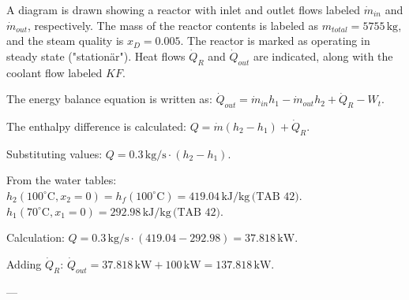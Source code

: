 A diagram is drawn showing a reactor with inlet and outlet flows labeled \( \dot{m}_{in} \) and \( \dot{m}_{out} \), respectively. The mass of the reactor contents is labeled as \( m_{total} = 5755 \, \text{kg} \), and the steam quality is \( x_D = 0.005 \). The reactor is marked as operating in steady state ("stationär"). Heat flows \( \dot{Q}_R \) and \( \dot{Q}_{out} \) are indicated, along with the coolant flow labeled \( KF \).  

The energy balance equation is written as:  
\( \dot{Q}_{out} = \dot{m}_{in} h_1 - \dot{m}_{out} h_2 + \dot{Q}_R - W_{t} \).  

The enthalpy difference is calculated:  
\( Q = \dot{m} (h_2 - h_1) + \dot{Q}_R \).  

Substituting values:  
\( Q = 0.3 \, \text{kg/s} \cdot (h_2 - h_1) \).  

From the water tables:  
\( h_2 (100^\circ \text{C}, x_2 = 0) = h_f (100^\circ \text{C}) = 419.04 \, \text{kJ/kg} \, \text{(TAB 42)} \).  
\( h_1 (70^\circ \text{C}, x_1 = 0) = 292.98 \, \text{kJ/kg} \, \text{(TAB 42)} \).  

Calculation:  
\( Q = 0.3 \, \text{kg/s} \cdot (419.04 - 292.98) = 37.818 \, \text{kW} \).  

Adding \( \dot{Q}_R \):  
\( \dot{Q}_{out} = 37.818 \, \text{kW} + 100 \, \text{kW} = 137.818 \, \text{kW} \).  

---